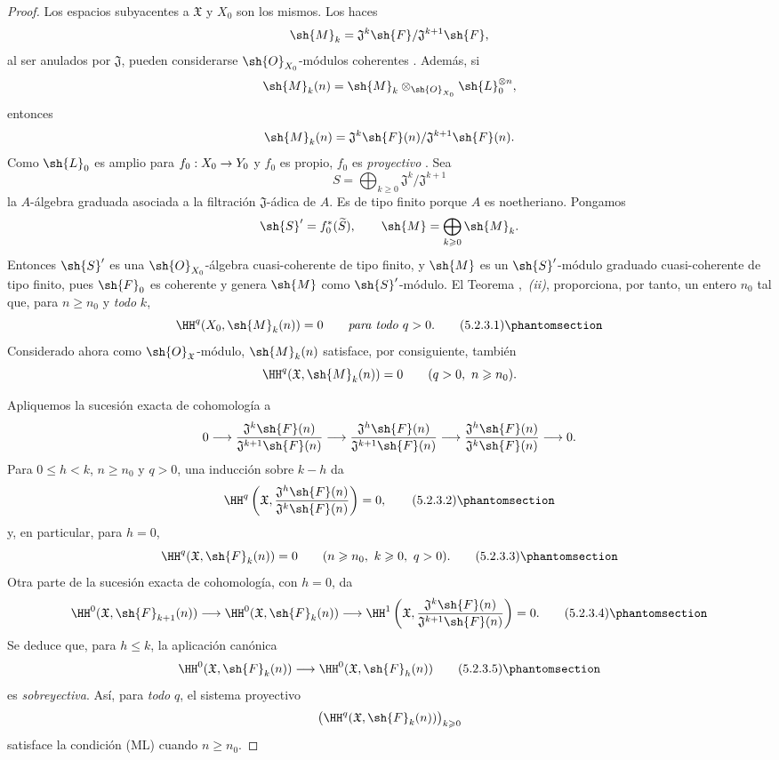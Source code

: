 \documentclass[oneside]{amsart}
\makeatletter
\renewcommand{\leq}{\leqslant}
\renewcommand{\geq}{\geqslant}
\newcommand{\ega@arrow}[2]{\mathchoice{#1}{#2}{#2}{#2}}
\renewcommand{\to}{\ega@arrow{\longrightarrow}{\rightarrow}}
\newcommand{\oldpage}[2][]{{\marginnote{\normalfont\textbf{#1}~|~#2}}\ignorespaces}
\let\EGAOriginalLabel\label
\renewcommand{\label}[1]{\phantomsection\EGAOriginalLabel{#1}}
\makeatother
\begin{document}
\begin{proof}
Los espacios subyacentes a $\mathfrak{X}$ y $X_0$ son los mismos.
Los haces
\[
  \sh{M}_k
  =
  \mathfrak{J}^k\sh{F}/\mathfrak{J}^{k+1}\sh{F},
\]
al ser anulados por $\mathfrak{J}$, pueden considerarse
$\sh{O}_{X_0}$-módulos coherentes . Además, si
\[
  \sh{M}_k(n)
  =
  \sh{M}_k\otimes_{\sh{O}_{X_0}}\sh{L}_0^{\otimes n},
\]
entonces
\[
  \sh{M}_k(n)
  =
  \mathfrak{J}^k\sh{F}(n)/
  \mathfrak{J}^{k+1}\sh{F}(n).
\]
Como $\sh{L}_0$ es amplio para $f_0:X_0\to Y_0$ y $f_0$ es
propio,
\oldpage[III]{152}
$f_0$ es \emph{proyectivo} . Sea
\[
  S=\bigoplus_{k\geq0}
  \mathfrak{J}^k/\mathfrak{J}^{k+1}
\]
la $A$-álgebra graduada asociada a la
filtración $\mathfrak{J}$-ádica de $A$. Es de tipo finito
porque $A$ es noetheriano. Pongamos
\[
  \sh{S}'=f_0^*(\widetilde{S}),\qquad
  \sh{M}=\bigoplus_{k\geq0}\sh{M}_k.
\]
Entonces $\sh{S}'$ es una $\sh{O}_{X_0}$-álgebra cuasi-coherente de
tipo finito, y $\sh{M}$ es un $\sh{S}'$-módulo graduado
cuasi-coherente de tipo finito, pues $\sh{F}_0$ es coherente y
genera $\sh{M}$ como $\sh{S}'$-módulo. El Teorema
,~\emph{(ii)}, proporciona, por tanto, un entero $n_0$
tal que, para $n\geq n_0$ y \emph{todo} $k$,
\[
  \HH^q(X_0,\sh{M}_k(n))=0
  \qquad\text{\emph{para todo} }q>0.
  \tag{5.2.3.1}
  \label{III.5.2.3.1}
\]
Considerado ahora como $\sh{O}_{\mathfrak{X}}$-módulo,
$\sh{M}_k(n)$ satisface, por consiguiente, también
\[
  \HH^q(\mathfrak{X},\sh{M}_k(n))=0
  \qquad(q>0,\ n\geq n_0).
\]

Apliquemos la sucesión exacta de cohomología a
\[
  0\longrightarrow
  \frac{\mathfrak{J}^k\sh{F}(n)}
       {\mathfrak{J}^{k+1}\sh{F}(n)}
  \longrightarrow
  \frac{\mathfrak{J}^h\sh{F}(n)}
       {\mathfrak{J}^{k+1}\sh{F}(n)}
  \longrightarrow
  \frac{\mathfrak{J}^h\sh{F}(n)}
       {\mathfrak{J}^{k}\sh{F}(n)}
  \longrightarrow0.
\]
Para $0\leq h<k$, $n\geq n_0$ y $q>0$, una inducción sobre $k-h$
da
\[
  \HH^q\left(
    \mathfrak{X},
    \frac{\mathfrak{J}^h\sh{F}(n)}
         {\mathfrak{J}^{k}\sh{F}(n)}
  \right)=0,
  \tag{5.2.3.2}
  \label{III.5.2.3.2}
\]
y, en particular, para $h=0$,
\[
  \HH^q(\mathfrak{X},\sh{F}_k(n))=0
  \qquad(n\geq n_0,\ k\geq0,\ q>0).
  \tag{5.2.3.3}
  \label{III.5.2.3.3}
\]
Otra parte de la sucesión exacta de cohomología, con $h=0$, da
\[
  \HH^0(\mathfrak{X},\sh{F}_{k+1}(n))
  \longrightarrow
  \HH^0(\mathfrak{X},\sh{F}_k(n))
  \longrightarrow
  \HH^1\left(
    \mathfrak{X},
    \frac{\mathfrak{J}^k\sh{F}(n)}
         {\mathfrak{J}^{k+1}\sh{F}(n)}
  \right)
  =0.
  \tag{5.2.3.4}
  \label{III.5.2.3.4}
\]
Se deduce que, para $h\leq k$, la aplicación canónica
\[
  \HH^0(\mathfrak{X},\sh{F}_k(n))
  \longrightarrow
  \HH^0(\mathfrak{X},\sh{F}_h(n))
  \tag{5.2.3.5}
  \label{III.5.2.3.5}
\]
es \emph{sobreyectiva}. Así, para \emph{todo} $q$, el sistema proyectivo
\[
  \bigl(\HH^q(\mathfrak{X},\sh{F}_k(n))\bigr)_{k\geq0}
\]
satisface la condición (ML) cuando $n\geq n_0$.


\end{proof}
\end{document}
